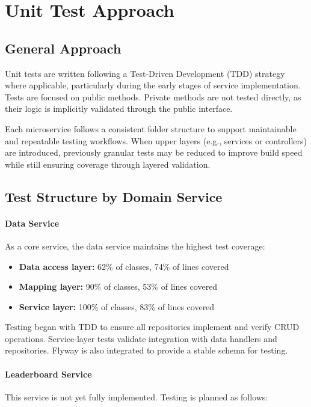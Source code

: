 \section{Unit Test Approach}
\label{section-unit-test-approach}

\subsection*{General Approach}

Unit tests are written following a Test-Driven Development (TDD) strategy where applicable, particularly during the early stages of service implementation. Tests are focused on public methods. Private methods are not tested directly, as their logic is implicitly validated through the public interface.

Each microservice follows a consistent folder structure to support maintainable and repeatable testing workflows. When upper layers (e.g., services or controllers) are introduced, previously granular tests may be reduced to improve build speed while still ensuring coverage through layered validation.

\subsection*{Test Structure by Domain Service}

\paragraph{Data Service}
As a core service, the data service maintains the highest test coverage:

\begin{itemize}
    \item \textbf{Data access layer:} 62\% of classes, 74\% of lines covered
    \item \textbf{Mapping layer:} 90\% of classes, 53\% of lines covered
    \item \textbf{Service layer:} 100\% of classes, 83\% of lines covered
\end{itemize}

Testing began with TDD to ensure all repositories implement and verify CRUD operations. Service-layer tests validate integration with data handlers and repositories. Flyway is also integrated to provide a stable schema for testing.

\paragraph{Leaderboard Service}
This service is not yet fully implemented. Testing is planned as follows:

